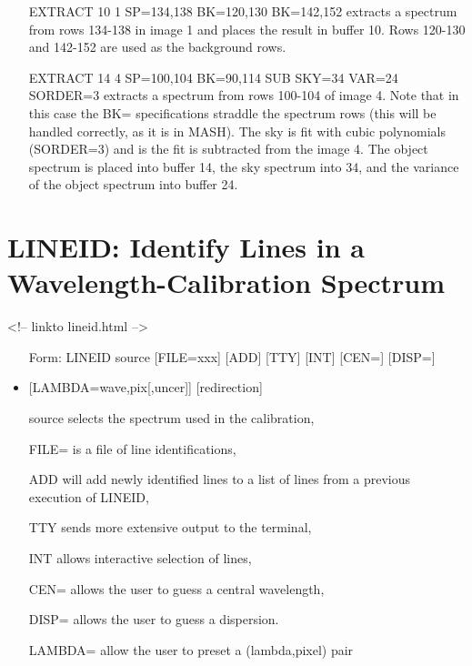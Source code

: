 \begin{itemize}
  \item[EXTRACT 10 1 SP=134,138 BK=120,130 BK=142,152\hfill]{ extracts a
       spectrum from rows 134-138 in image 1 and places the result in
       buffer 10.  Rows 120-130 and 142-152 are used as the background
       rows.}

  \item[EXTRACT 14 4 SP=100,104 BK=90,114 SUB SKY=34 VAR=24
       SORDER=3\hfill]{ extracts a spectrum from rows 100-104 of image 4.
       Note that in this case the BK= specifications straddle the spectrum
       rows (this will be handled correctly, as it is in MASH).  The sky is
       fit with cubic polynomials (SORDER=3) and is the fit is subtracted
       from the image 4.  The object spectrum is placed into buffer 14, the
       sky spectrum into 34, and the variance of the object spectrum into
       buffer 24.}
\end{itemize}

\section{LINEID: Identify Lines in a Wavelength-Calibration Spectrum}
\begin{rawhtml}
<!-- linkto lineid.html -->
\end{rawhtml}
\begin{itemize}
  \item[Form: LINEID source {[FILE=xxx]} {[ADD]} {[TTY]} {[INT]} {[CEN=]} 
       {[DISP=]}\hfill]{}
  \item{{[LAMBDA=wave,pix{[,uncer]}]} {[redirection]}}
  \item[source]{selects the spectrum used in the calibration,}
  \item[FILE=]{is a file of line identifications,}
  \item[ADD]{will add newly identified lines to a list
       of lines from a previous execution of LINEID,}
  \item[TTY]{sends more extensive output to the terminal,}
  \item[INT]{allows interactive selection of lines,}
  \item[CEN=]{allows the user to guess a central wavelength,}
  \item[DISP=]{allows the user to guess a dispersion.}
  \item[LAMBDA=]{allow the user to preset a (lambda,pixel) pair}
\end{itemize}

